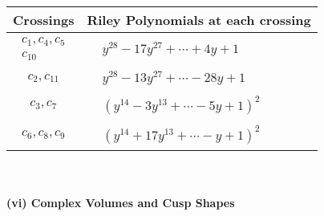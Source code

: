 \documentclass[1p]{elsarticle_modified}
\theoremstyle{definition}
\begin{document}
\begin{tabular}{m{50pt}|m{274pt}}
Crossings & \hspace{64pt}Riley Polynomials at each crossing \\
\hline $$\begin{aligned}c_{1},c_{4},c_{5}\\c_{10}\end{aligned}$$&$\begin{aligned}
&y^{28}-17 y^{27}+\cdots+4 y+1
\end{aligned}$\\
\hline $$\begin{aligned}c_{2},c_{11}\end{aligned}$$&$\begin{aligned}
&y^{28}-13 y^{27}+\cdots-28 y+1
\end{aligned}$\\
\hline $$\begin{aligned}c_{3},c_{7}\end{aligned}$$&$\begin{aligned}
&(y^{14}-3 y^{13}+\cdots-5 y+1)^{2}
\end{aligned}$\\
\hline $$\begin{aligned}c_{6},c_{8},c_{9}\end{aligned}$$&$\begin{aligned}
&(y^{14}+17 y^{13}+\cdots- y+1)^{2}
\end{aligned}$\\
\hline
\end{tabular}\\~\\
\newpage\flushleft \textbf{(vi) Complex Volumes and Cusp Shapes}
\end{document}
